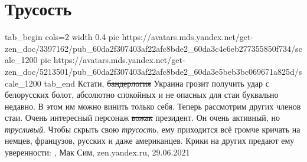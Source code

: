  
 
 
 
 
\chapter{Трусость}

\ifcmt
  tab_begin cols=2
		width 0.4
	  pic https://avatars.mds.yandex.net/get-zen_doc/3397162/pub_60da2f307403af22afc8bde2_60da3c4e6eb277355850f734/scale_1200
    pic https://avatars.mds.yandex.net/get-zen_doc/5213501/pub_60da2f307403af22afc8bde2_60da3e5beb3bc069671a825d/scale_1200
  tab_end
\fi
Кстати, \sout{бандерлогия} Украина грозит получить удар с белорусских болот, абсолютно
спокойных и не опасных для стаи буквально недавно. В этом им можно винить
только себя.  Теперь рассмотрим других членов стаи. Очень интересный персонаж
\sout{вожак} президент. Он очень активный, но \emph{трусливый}. Чтобы скрыть свою \emph{трусость},
ему приходится всё громче кричать на немцев, французов, русских и даже
американцев. Крики на других предают ему уверенности:
, 
Мак Сим, zen.yandex.ru, 29.06.2021
